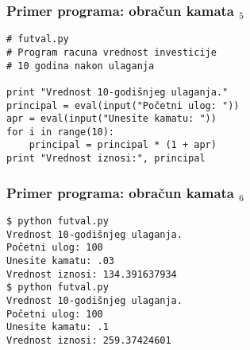 \documentclass[utf8,compress]{beamer}
\begin{document}

\begin{frame}[fragile]
  \frametitle{Primer programa: obračun kamata $_5$}
\begin{verbatim}
# futval.py
# Program racuna vrednost investicije
# 10 godina nakon ulaganja

print "Vrednost 10-godišnjeg ulaganja."
principal = eval(input("Početni ulog: "))
apr = eval(input("Unesite kamatu: "))
for i in range(10):
    principal = principal * (1 + apr)
print "Vrednost iznosi:", principal
\end{verbatim}
\end{frame}

\begin{frame}[fragile]
  \frametitle{Primer programa: obračun kamata $_6$}
\begin{verbatim}
$ python futval.py
Vrednost 10-godišnjeg ulaganja.
Početni ulog: 100
Unesite kamatu: .03
Vrednost iznosi: 134.391637934
$ python futval.py
Vrednost 10-godišnjeg ulaganja.
Početni ulog: 100
Unesite kamatu: .1
Vrednost iznosi: 259.37424601
\end{verbatim}
\end{frame}
\end{document}
